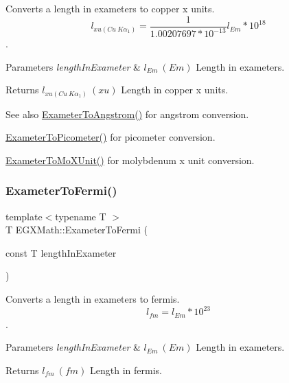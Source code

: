 Converts a length in exameters to copper x units. \[ l_{xu(Cu\ K\alpha_1)}= \frac{1}{1.00207697*10^{-13}} l_{Em} * 10^{18}\]. 


\begin{DoxyParams}{Parameters}
{\em length\+In\+Exameter} & $ l_{Em}\ (Em)$ Length in exameters. \\
\hline
\end{DoxyParams}
\begin{DoxyReturn}{Returns}
$ l_{xu(Cu\ K\alpha_1)}\ (xu)$ Length in copper x units. 
\end{DoxyReturn}
\begin{DoxySeeAlso}{See also}
\mbox{\hyperlink{group___e_g_x_math-_conversions-_length_conversions-_s_i-_exameter-_non-_s_i_ga24d2ee057470ce37f99d31451e010a22}{Exameter\+To\+Angstrom()}} for angstrom conversion. 

\mbox{\hyperlink{group___e_g_x_math-_conversions-_length_conversions-_s_i-_exameter-_s_i_gaf524e8324fedf2eb61d43ce1dc36bcac}{Exameter\+To\+Picometer()}} for picometer conversion. 

\mbox{\hyperlink{group___e_g_x_math-_conversions-_length_conversions-_s_i-_exameter-_non-_s_i_gadf73e46609660df6b7ae77ec7241183e}{Exameter\+To\+Mo\+X\+Unit()}} for molybdenum x unit conversion. 
\end{DoxySeeAlso}
\mbox{\label{group___e_g_x_math-_conversions-_length_conversions-_s_i-_exameter-_non-_s_i_ga0aa0524461cbce1fcc102b847545d212}} 
\subsubsection{\texorpdfstring{Exameter\+To\+Fermi()}{ExameterToFermi()}}
{\footnotesize\ttfamily template$<$typename T $>$ \\
T E\+G\+X\+Math\+::\+Exameter\+To\+Fermi (\begin{DoxyParamCaption}\item[{const T}]{length\+In\+Exameter }\end{DoxyParamCaption})}



Converts a length in exameters to fermis. \[ l_{fm}=l_{Em} * 10^{23} \]. 


\begin{DoxyParams}{Parameters}
{\em length\+In\+Exameter} & $ l_{Em}\ (Em)$ Length in exameters. \\
\hline
\end{DoxyParams}
\begin{DoxyReturn}{Returns}
$ l_{fm}\ (fm)$ Length in fermis. 
\end{DoxyReturn}
\mbox{\label{group___e_g_x_math-_conversions-_length_conversions-_s_i-_exameter-_non-_s_i_ga3356bb6585e02757a196b299c29660c1}} 
